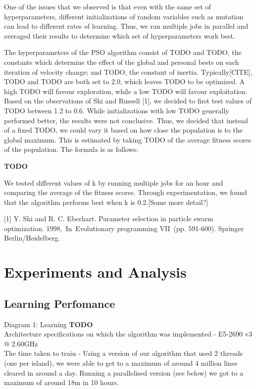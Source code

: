 \documentclass{article}
\begin{document}
	One of the issues that we observed is that even with the same set of hyperparameters,
	different initializations of random variables such as mutation can lead to
	different rates of learning. Thus, we ran multiple jobs in parallel and averaged
	their results to determine which set of hyperparameters work best.

	The hyperparameters of the PSO algorithm consist of  TODO and TODO, the constants
	which determine the effect of the global and personal bests on each iteration
	of velocity change; and TODO, the constant of inertia. Typically[CITE], TODO and TODO are both
	set to 2.0, which leaves TODO to be optimized. A high TODO will favour exploration,
	while a low TODO will favour exploitation. Based on the observations of Shi and
	Russell [1], we decided to first test values of TODO between 1.2 to 0.6.
	While initializations with low TODO generally performed better, the results were
	not conclusive. Thus, we decided that instead of a fixed TODO, we could vary it
	based on how close the population is to the global maximum. This is estimated
	by taking TODO of the average fitness scores of the population. The formula is as follows:

	\textbf{TODO}

	We tested different values of k by running multiple jobs for an hour and comparing
 	the average of the fitness scores. Through experimentation, we found that the
	algorithm performs best when k is 0.2.[Some more detail?]

	[1] Y. Shi and R. C. Eberhart. Parameter selection in particle swarm optimization. 1998, In Evolutionary programming VII (pp. 591-600). Springer Berlin/Heidelberg.


    \section{Experiments and Analysis}

	\subsection{Learning Perfomance}
	Diagram 1: Learning
	\textbf{TODO}\\
	Architecture specifications on which the algorithm was implemented - E5-2690 v3 @ 2.60GHz\\
	The time taken to train - Using a version of our algorithm that used 2 threads (one per island),
	we were able to get to a maximum of around 4 million lines cleared in
	around a day. Running a parallelised version (see below) we got to a maximum of
	around 18m in 10 hours.\\
\end{document}
